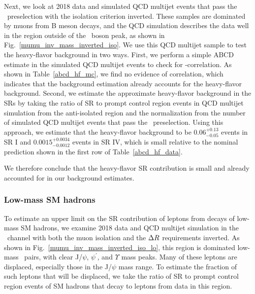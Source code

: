 Next, we look at 2018 data and simulated QCD multijet events that pass the \Pgm\Pgm\ preselection with the isolation criterion inverted. These samples are dominated by muons from B meson decays, and the QCD simulation describes the data well in the region outside of the \cPZ\ boson peak, as shown in Fig.~\ref{mumu_inv_mass_inverted_iso}. We use this QCD multijet sample to test the heavy-flavor background in two ways. First, we perform a simple ABCD estimate in the simulated QCD multijet events to check for \ada-\adb correlation. As shown in Table~\ref{abcd_hf_mc}, we find no evidence of correlation, which indicates that the background estimation already accounts for the heavy-flavor background. Second, we estimate the approximate heavy-flavor background in the SRs by taking the ratio of SR to prompt control region events in QCD multijet simulation from the anti-isolated region and the normalization from the number of simulated QCD multijet events that pass the \Pgm\Pgm\ preselection. Using this approach, we estimate that the heavy-flavor background to be $0.06^{+0.13}_{-0.05}$ events in SR I and $0.0015^{+0.0034}_{-0.0012}$ events in SR IV, which is small relative to the nominal prediction shown in the first row of Table~\ref{abcd_hf_data}.




We therefore conclude that the heavy-flavor SR contribution is small and already accounted for in our background estimates.

\subsubsection{Low-mass SM hadrons}
To estimate an upper limit on the SR contribution of leptons from decays of low-mass SM hadrons, we examine 2018 data and QCD multijet simulation in the \Pgm\Pgm\ channel with both the muon isolation and the $\Delta R$ requirements inverted. As shown in Fig.~\ref{mumu_inv_mass_inverted_iso_lo}, this region is dominated low-mass \Pgm\Pgm\ pairs, with clear J/$\psi$, $\psi^\prime$, and $\Upsilon$ mass peaks. Many of these leptons are displaced, especially those in the J/$\psi$ mass range. To estimate the fraction of such leptons that will be displaced, we take the ratio of SR to prompt control region events of SM hadrons that decay to leptons from data in this region.



